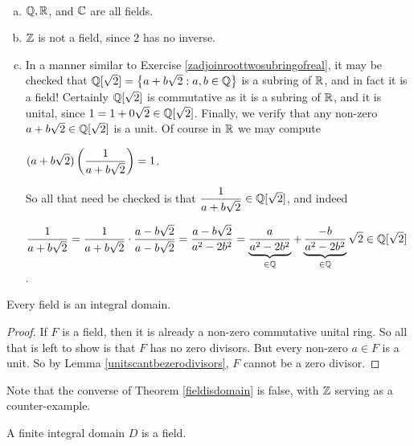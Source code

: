 \documentclass[11pt,fleqn,dvipsnames,usenames]{article}
\begin{document}
\begin{examples}~
\begin{enumerate}[(a)]
\item $\mathbb{Q}, \mathbb{R}$, and $\mathbb{C}$ are all fields.
\item $\mathbb{Z}$ is not a field, since $2$ has no inverse.
\item In a manner similar to Exercise \ref{zadjoinroottwosubringofreal}, it may be checked that $\mathbb{Q}[\sqrt{2}] = \left\{a + b\sqrt{2}:a,b\in\mathbb{Q}\right\}$ is a subring of $\mathbb{R}$, and in fact it is a field!  Certainly $\mathbb{Q}[\sqrt{2}]$ is commutative as it is a subring of $\mathbb{R}$, and it is unital, since $1 = 1 + 0\sqrt{2}\in\mathbb{Q}[\sqrt{2}]$.  Finally, we verify that any non-zero $a+b\sqrt{2}\in \mathbb{Q}[\sqrt{2}]$ is a unit.  Of course in $\mathbb{R}$ we may compute
\begin{center}
$(\displaystyle{a + b\sqrt{2})\left(\frac{1}{a + b\sqrt{2}}\right) = 1}$.
\end{center}
So all that need be checked is that $\dfrac{1}{a + b\sqrt{2}}\in \mathbb{Q}[\sqrt{2}]$, and indeed
\begin{center}
$\displaystyle{\frac{1}{a + b\sqrt{2}} = \frac{1}{a + b\sqrt{2}}\cdot\frac{a - b\sqrt{2}}{a - b\sqrt{2}} = \frac{a - b\sqrt{2}}{a^2 - 2b^2} = \underbrace{\frac{a}{a^2 - 2b^2}}_{\in\mathbb{Q}} + \underbrace{\frac{-b}{a^2 - 2b^2}}_{\in\mathbb{Q}}\sqrt{2}\in\mathbb{Q}[\sqrt{2}]}$.
\end{center}
\end{enumerate}
\end{examples}
%
\begin{theorem}\label{fieldisdomain}
Every field is an integral domain.
\end{theorem}
%
\begin{proof}
If $F$ is a field, then it is already a non-zero commutative unital ring.  So all that is left to show is that $F$ has no zero divisors.  But every non-zero $a\in F$ is a unit.  So by Lemma \ref{unitscantbezerodivisors}, $F$ cannot be a zero divisor.
\end{proof}
%
\begin{remark}
Note that the converse of Theorem \ref{fieldisdomain} is false, with $\mathbb{Z}$ serving as a counter-example.
\end{remark}
%
\begin{theorem}
A finite integral domain $D$ is a field.
\end{theorem}
%
\end{document}
